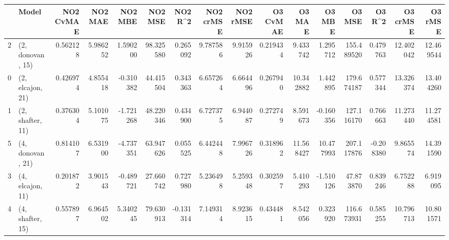 \begin{tabular}{llrrrrrrrrrrrrrr}
\toprule
{} &             Model &  NO2 CvMAE &   NO2 MAE &   NO2 MBE &    NO2 MSE &   NO2 R\textasciicircum2 &  NO2 crMSE &  NO2 rMSE &  O3 CvMAE &     O3 MAE &     O3 MBE &      O3 MSE &    O3 R\textasciicircum2 &   O3 crMSE &    O3 rMSE \\
\midrule
2 &  (2, donovan, 15) &   0.562128 &  5.986252 &  1.590200 &  98.325580 &  0.265092 &   9.787586 &  9.915926 &  0.219434 &   9.433742 &   1.295712 &  155.489520 &  0.479763 &  12.402042 &  12.469544 \\
0 &  (2, elcajon, 21) &   0.426974 &  4.855418 & -0.310382 &  44.415504 &  0.343363 &   6.657264 &  6.664496 &  0.267940 &  10.342882 &   1.442895 &  179.674187 &  0.577344 &  13.326374 &  13.404260 \\
1 &  (2, shafter, 11) &   0.376304 &  5.101075 & -1.721268 &  48.220346 &  0.434900 &   6.727375 &  6.944087 &  0.272749 &   8.591673 &  -0.160356 &  127.116170 &  0.766663 &  11.273440 &  11.274581 \\
5 &  (4, donovan, 21) &   0.814107 &  6.531900 & -4.737351 &  63.947626 &  0.055525 &   6.442448 &  7.996726 &  0.318962 &  11.568427 &  10.477993 &  207.117876 & -0.208380 &   9.865574 &  14.391590 \\
3 &  (4, elcajon, 11) &   0.201872 &  3.901543 & -0.489721 &  27.660742 &  0.727980 &   5.236498 &  5.259348 &  0.302597 &   5.410293 &  -1.510126 &   47.873870 &  0.839246 &   6.752288 &   6.919095 \\
4 &  (4, shafter, 15) &   0.557897 &  6.964502 &  5.340245 &  79.630913 & -0.131314 &   7.149314 &  8.923615 &  0.434481 &   8.542056 &   0.323920 &  116.673931 &  0.585255 &  10.796713 &  10.801571 \\
\bottomrule
\end{tabular}
